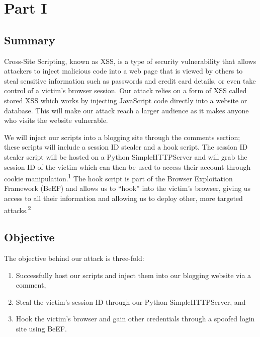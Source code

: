 \documentclass{article}
\begin{document}
    \frenchspacing

    \maketitle

    \section*{Part I}

    \subsection*{Summary}

    Cross-Site Scripting, known as XSS, is a type of security vulnerability that allows attackers to inject malicious code into a web page that is viewed by others to steal sensitive information such as passwords and credit card details, or even take control of a victim's browser session. Our attack relies on a form of XSS called stored XSS which works by injecting JavaScript code directly into a website or database. This will make our attack reach a larger audience as it makes anyone who visits the website vulnerable.

    \vspace{8pt}

    We will inject our scripts into a blogging site through the comments section; these scripts will include a session ID stealer and a hook script. The session ID stealer script will be hosted on a Python SimpleHTTPServer and will grab the session ID of the victim which can then be used to access their account through cookie manipulation.\textsuperscript{1} The hook script is part of the Browser Exploitation Framework (BeEF) and allows us to ``hook'' into the victim's browser, giving us access to all their information and allowing us to deploy other, more targeted attacks.\textsuperscript{2}

    \subsection*{Objective}

    The objective behind our attack is three-fold:

    \begin{enumerate}[labelindent=\parindent, leftmargin=*]
        \item Successfully host our scripts and inject them into our blogging website via a comment,
        \item Steal the victim's session ID through our Python SimpleHTTPServer, and
        \item Hook the victim's browser and gain other credentials through a spoofed login site using BeEF.
    \end{enumerate}
\end{document}
